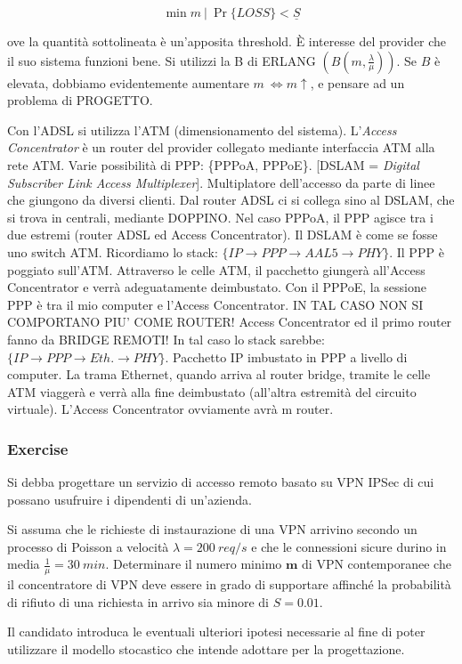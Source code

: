 \[
	\min{m}\ |\ \Pr\{LOSS\} < \underline{S}
\]

ove la quantità sottolineata è un'apposita threshold. \`E interesse del provider che il suo sistema funzioni bene. Si utilizzi la B di ERLANG $(B(m,\frac{\lambda}{\mu}))$. Se $B$ è elevata, dobbiamo evidentemente aumentare $m\ \iff m\uparrow$, e pensare ad un problema di PROGETTO.

Con l'ADSL si utilizza l'ATM (dimensionamento del sistema). L'\textit{Access Concentrator} è un router del provider collegato mediante interfaccia ATM alla rete ATM. Varie possibilità di PPP: \{PPPoA, PPPoE\}. [DSLAM = \textit{Digital Subscriber Link Access Multiplexer}]. Multiplatore dell'accesso da parte di linee che giungono da diversi clienti. Dal router ADSL ci si collega sino al DSLAM, che si trova in centrali, mediante DOPPINO. Nel caso PPPoA, il PPP agisce tra i due estremi (router ADSL ed Access Concentrator). Il DSLAM è come se fosse uno switch ATM. Ricordiamo lo stack: $\{IP \to PPP \to AAL5 \to PHY\}$. Il PPP è poggiato sull'ATM. Attraverso le celle ATM, il pacchetto giungerà all'Access Concentrator e verrà adeguatamente deimbustato. Con il PPPoE, la sessione PPP è tra il mio computer e l'Access Concentrator. IN TAL CASO NON SI COMPORTANO PIU' COME ROUTER! Access Concentrator ed il primo router fanno da BRIDGE REMOTI! In tal caso lo stack sarebbe: $\{IP \to PPP \to Eth. \to PHY\}$. Pacchetto IP imbustato in PPP a livello di computer. La trama Ethernet, quando arriva al router bridge, tramite le celle ATM viaggerà e verrà alla fine deimbustato (all'altra estremità del circuito virtuale). L'Access Concentrator ovviamente avrà m router.

\subsubsection{Exercise}

Si debba progettare un servizio di accesso remoto basato su VPN IPSec di cui possano usufruire i dipendenti di un'azienda.

Si assuma che le richieste di instaurazione di una VPN arrivino secondo un processo di Poisson a velocità $\lambda=200\ req/s$ e che le connessioni sicure durino in media $\frac{1}{\mu} = 30\ min$. Determinare il numero minimo $\mathbf{m}$ di VPN contemporanee che il concentratore di VPN deve essere in grado di supportare affinché la probabilità di rifiuto di una richiesta in arrivo sia minore di $S=0.01$.

Il candidato introduca le eventuali ulteriori ipotesi necessarie al fine di poter utilizzare il modello stocastico che intende adottare per la progettazione.

